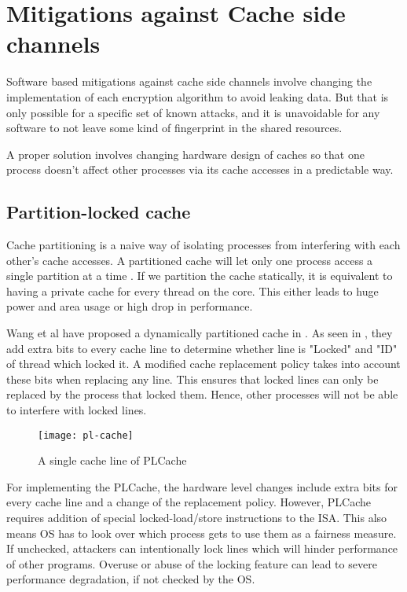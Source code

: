 \chapter{Mitigations against Cache side channels}

Software based mitigations against cache side channels involve changing the
implementation of each encryption algorithm to avoid leaking data. But that is only
possible for a specific set of known attacks, and it is unavoidable for any software
to not leave some kind of fingerprint in the shared resources.

A proper solution involves changing hardware design of caches so that one process
doesn't affect other processes via its cache accesses in a predictable way.

\section{Partition-locked cache}

Cache partitioning is a naive way of isolating processes from interfering with
each other's cache accesses.
A partitioned cache will let only one process access a single partition at a
time .
If we partition the cache statically, it is equivalent to having a private
cache for every thread on the core.
This either leads to huge power and area usage or high drop in performance.

Wang et al have proposed a dynamically partitioned cache in . As seen in ,
they add extra bits to every cache line to determine whether line is "Locked"
and "ID" of thread which locked it.
A modified cache replacement policy takes into account these bits when
replacing any line.
This ensures that locked lines can only be replaced by the process that locked
them. Hence, other processes will not be able to interfere with locked lines.

\begin{figure}
    \centering
    \texttt{[image: pl-cache]}
    \caption{A single cache line of PLCache}
    \label{fig:plcache}
\end{figure}

For implementing the PLCache, the hardware level changes include extra bits
for every cache line and a change of the replacement policy.
However, PLCache requires addition of special locked-load/store instructions to the ISA.
This also means OS has to look over which process gets to use them as a fairness measure.
If unchecked, attackers can intentionally lock lines which will hinder
performance of other programs.
Overuse or abuse of the locking feature can lead to severe performance
degradation, if not checked by the OS.

